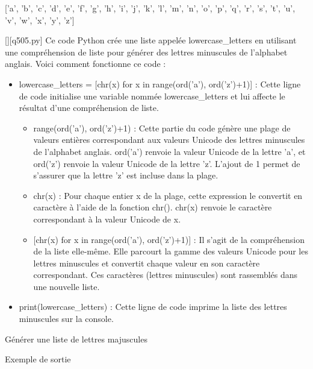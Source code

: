 ['a', 'b', 'c', 'd', 'e', 'f', 'g', 'h', 'i', 'j', 'k', 'l', 'm', 'n', 'o', 'p', 'q', 'r', 's', 't', 'u', 'v', 'w', 'x', 'y', 'z']
        \par
        \begin{solution}
            \renewcommand{\nomfichier}{q505.py}
            \pythonfile{\chemincode \nomfichier}[][\nomfichier]
            Ce code Python crée une liste appelée lowercase\_letters en utilisant une compréhension de liste pour générer des lettres minuscules de l'alphabet anglais. Voici comment fonctionne ce code :\par

 \begin{itemize}
 \item    lowercase\_letters = [chr(x) for x in range(ord('a'), ord('z')+1)] : Cette ligne de code initialise une variable nommée lowercase\_letters et lui affecte le résultat d'une compréhension de liste.

 \begin{itemize}
 \item        range(ord('a'), ord('z')+1) : Cette partie du code génère une plage de valeurs entières correspondant aux valeurs Unicode des lettres minuscules de l'alphabet anglais. ord('a') renvoie la valeur Unicode de la lettre 'a', et ord('z') renvoie la valeur Unicode de la lettre 'z'. L'ajout de 1 permet de s'assurer que la lettre 'z' est incluse dans la plage.
 \item         chr(x) : Pour chaque entier x de la plage, cette expression le convertit en caractère à l'aide de la fonction chr(). chr(x) renvoie le caractère correspondant à la valeur Unicode de x.
 \item{}         [chr(x) for x in range(ord('a'), ord('z')+1)] : Il s'agit de la compréhension de la liste elle-même. Elle parcourt la gamme des valeurs Unicode pour les lettres minuscules et convertit chaque valeur en son caractère correspondant. Ces caractères (lettres minuscules) sont rassemblés dans une nouvelle liste.
 \end{itemize}
 \item   print(lowercase\_letters) : Cette ligne de code imprime la liste des lettres minuscules sur la console. 
 \end{itemize}
        \end{solution}
        

        \question
        Générer une liste de lettres majuscules

Exemple de sortie

